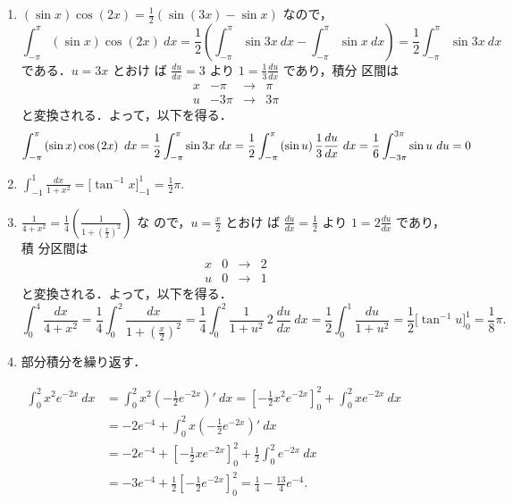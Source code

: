 \documentclass[11pt, uplatex, dvipdfmx]{jsarticle}
\newcommand{\ds}{\displaystyle}
\begin{document}
\begin{enumerate}[(1)]
   \item
     $\left(\sin x\right) \cos \left(2x\right) =
     \frac{1}{2}\left( \sin \left( 3x \right) - \sin x\right)$ なので，
     \[
       \int_{-\pi}^{\pi} \left(\sin x \right) \cos \left(2x\right) \ dx = \frac{1}{2} \left(
         \int_{-\pi}^{\pi}\sin 3x \ dx - \int_{-\pi}^{\pi} \sin x \ dx\right)
       = \frac{1}{2}\int_{-\pi}^{\pi} \sin 3x \ dx
     \]
     である．$u=3x$ とおけ
     ば $\frac{du}{dx}=3$ より $1=\frac{1}{3}\frac{du}{dx}$ であり，積分
     区間は
     \[
       \begin{array}{c|ccc}
         x & -\pi & \to & \pi\\ \hline
         u & -3\pi & \to &3 \pi
       \end{array}
     \]
     と変換される．よって，以下を得る．
     \[
       \int_{-\pi}^{\pi}\left( \sin x \right) \cos \left( 2x\right) \
       dx = \frac{1}{2} \int_{-\pi}^{\pi} \sin 3x \ dx = \frac{1}{2}
       \int_{-\pi}^{\pi}\left( \sin u \right) \frac{1}{3}
       \frac{du}{dx} \ dx = \frac{1}{6} \int_{-3\pi}^{3\pi} \sin u \
       du=0\\
     \]

   \item $\ds \int_{-1}^{1} \frac{dx}{1+x^2}= \Big[ \tan^{-1} x \Big]_{-1}^{1} = \frac{1}{2}\pi.$

   \item
     $\ds \frac{1}{4+x^2}=
     \frac{1}{4}\left(\frac{1}{1+\left(\frac{x}{2}\right)^2}\right)$ な
     ので，$u=\frac{x}{2}$ とおけ
     ば $\frac{du}{dx}=\frac{1}{2}$ より $1=2\frac{du}{dx}$ であり，積
     分区間は
     \[
       \begin{array}{c|ccc}
         x & 0 & \to & 2 \\ \hline
         u & 0 & \to & 1
       \end{array}
     \]
     と変換される．よって，以下を得る．
     \[
       \int_{0}^{4}\frac{dx}{4+x^2} = \frac{1}{4} \int_{0}^{2} \frac{dx}{1+\left(\frac{x}{2}\right)^2} = \frac{1}{4}
       \int_{0}^{2} \frac{1}{1+u^2} \ 2\  \frac{du}{dx} \ dx = \frac{1}{2} \int_{0}^{1} \frac{du}{1+u^2}
       = \frac{1}{2} \Big[ \tan^{-1} u \Big]_{0}^{1} = \frac{1}{8}\pi.
     \]


   \item 部分積分を繰り返す．
     
     \vspace{.1in}

     $\ds
     \begin{aligned}
       \int_{0}^{2} x^2 e^{-2x} \ dx &= \int_{0}^{2} x^2
       \left(-\frac{1}{2} e^{-2x} \right)' \ dx = \left[-\frac{1}{2} x^2
         e^{-2x} \right]_{0}^{2} + \int_{0}^{2} x e^{-2x} \ dx\\
       &= -2e^{-4} + \int_{0}^{2} x \left( -\frac{1}{2} e^{-2x}\right)' \ dx\\
       &= -2e^{-4} + \left[ -\frac{1}{2}x e^{-2x} \right]_{0}^{2} + \frac{1}{2} \int_{0}^{2} e^{-2x} \ dx\\
       &= -3e^{-4} + \frac{1}{2} \left[ -\frac{1}{2} e^{-2x}\right]_{0}^{2} = \frac{1}{4} - \frac{13}{4}e^{-4}.
     \end{aligned}
     $


\end{enumerate}
\end{document}
